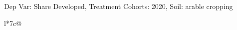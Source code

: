 \begin{table}[H]
\captionlistentry[table]{}
\label{table:beaver_land_class_DVis_land_class_3_SCg3_SSAC}
\scriptsize %
Dep Var: Share Developed, Treatment Cohorts: 2020, Soil: arable cropping \\
\begin{threeparttable}
\begin{tabulary}{\textwidth}{l*{7}{c}@{}}
\toprule \toprule
\noalign{\smallskip}
\noalign{\smallskip}
\midrule \bottomrule
\end{tabulary}
\medskip
\end{threeparttable}
\end{table}
